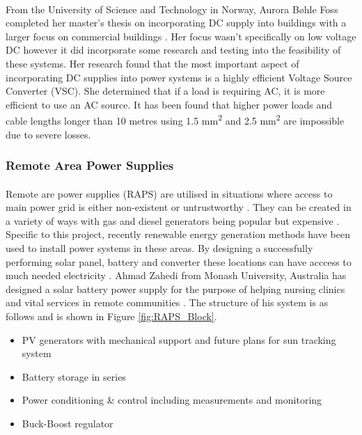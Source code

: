 \paragraph{}
From the University of Science and Technology in Norway, Aurora Bøhle Foss completed her master's thesis on incorporating DC supply into buildings with a larger focus on commercial buildings \cite{Foss2014}. Her focus wasn't specifically on low voltage DC however it did incorporate some research and testing into the feasibility of these systems. Her research found that the most important aspect of incorporating DC supplies into power systems is a highly efficient Voltage Source Converter (VSC). She determined that if a load is requiring AC, it is more efficient to use an AC source. It has been found that higher power loads and cable lengths longer than 10 metres using  1.5 \si{mm^2} and  2.5 \si{mm^2} are impossible due to severe losses.



\subsubsection{Remote Area Power Supplies}

\paragraph{}
Remote are power supplies (RAPS) are utilised in situations where access to main power grid is either non-existent or untrustworthy \cite{Mendis2010}. They can be created in a variety of ways with gas and diesel generators being popular but expensive \cite{Mendis2010}. Specific to this project, recently renewable energy generation methods have been used to install power systems in these areas. By designing a successfully performing solar panel, battery and converter these locations can have acccess to much needed electricity \cite{Zahedi}. Ahmad Zahedi from Monash University, Australia has designed a solar battery power supply for the purpose of helping nursing clinics and vital services in remote communities \cite{Zahedi}. The structure of his system is as follows and is shown in Figure \ref{fig:RAPS_Block}.

\begin{itemize}[noitemsep]
\item PV generators with mechanical support and future plans for sun tracking system
\item Battery storage in series
\item Power conditioning \& control including measurements and monitoring
\item Buck-Boost regulator
\end{itemize}  

